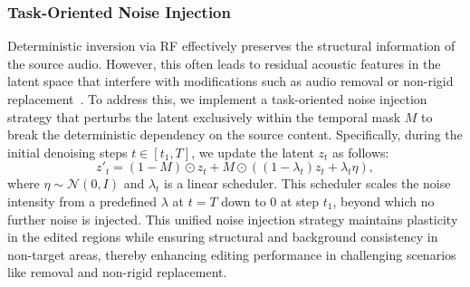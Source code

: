 \subsubsection{Task-Oriented Noise Injection}
\label{sec:toni}

Deterministic inversion via RF effectively preserves the structural information of the source audio. However, this often leads to residual acoustic features in the latent space that interfere with modifications such as audio removal or non-rigid replacement~\cite{zhu2025kv}. To address this, we implement a task-oriented noise injection strategy that perturbs the latent exclusively within the temporal mask $M$ to break the deterministic dependency on the source content. Specifically, during the initial denoising steps $t \in [t_1, T]$, we update the latent $z_t$ as follows:
\begin{equation}
z'_t = (1 - M) \odot z_t + M \odot ((1 - \lambda_t) z_t + \lambda_t \eta),
\end{equation}
where $\eta \sim \mathcal{N}(0, I)$ and $\lambda_t$ is a linear scheduler. This scheduler scales the noise intensity from a predefined $\lambda$ at $t=T$ down to $0$ at step $t_1$, beyond which no further noise is injected. This unified noise injection strategy maintains plasticity in the edited regions while ensuring structural and background consistency in non-target areas, thereby enhancing editing performance in challenging scenarios like removal and non-rigid replacement.

